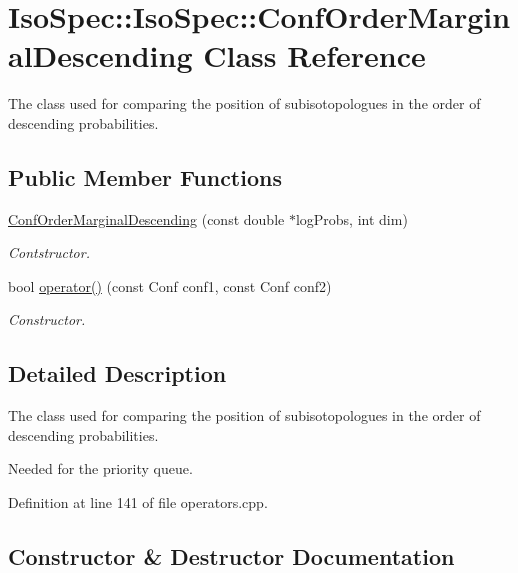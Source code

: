 \hypertarget{class_iso_spec_1_1_iso_spec_1_1_conf_order_marginal_descending}{}\section{Iso\+Spec\+:\+:Iso\+Spec\+:\+:Conf\+Order\+Marginal\+Descending Class Reference}
\label{class_iso_spec_1_1_iso_spec_1_1_conf_order_marginal_descending}


The class used for comparing the position of subisotopologues in the order of descending probabilities.  


\subsection*{Public Member Functions}
\begin{DoxyCompactItemize}
\item 
\mbox{\hyperlink{class_iso_spec_1_1_iso_spec_1_1_conf_order_marginal_descending_a331cca614490a25d2bf4d48e04a1eba3}{Conf\+Order\+Marginal\+Descending}} (const double $\ast$log\+Probs, int dim)
\begin{DoxyCompactList}\small\item\em Contstructor. \end{DoxyCompactList}\item 
bool \mbox{\hyperlink{class_iso_spec_1_1_iso_spec_1_1_conf_order_marginal_descending_a24753a23a4484aa1247606e15362dee0}{operator()}} (const Conf conf1, const Conf conf2)
\begin{DoxyCompactList}\small\item\em Constructor. \end{DoxyCompactList}\end{DoxyCompactItemize}


\subsection{Detailed Description}
The class used for comparing the position of subisotopologues in the order of descending probabilities. 

Needed for the priority queue. 

Definition at line 141 of file operators.\+cpp.



\subsection{Constructor \& Destructor Documentation}
\mbox{\label{class_iso_spec_1_1_iso_spec_1_1_conf_order_marginal_descending_a331cca614490a25d2bf4d48e04a1eba3}} 
